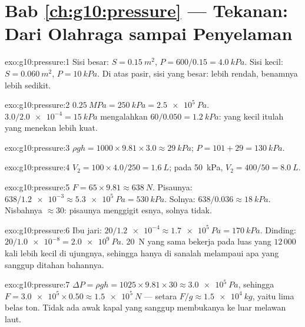 \section*{Bab \ref{ch:g10:pressure} --- Tekanan: Dari Olahraga sampai Penyelaman}

\begin{solution}{exo:g10:pressure:1}
Sisi besar: $S = \qty{0.15}{m^2}$, $P = 600/0.15 = \qty{4.0}{kPa}$.
Sisi kecil: $S = \qty{0.060}{m^2}$, $P = \qty{10}{kPa}$. Di atas pasir,
sisi yang besar:  lebih rendah, benamnya lebih sedikit.
\end{solution}

\begin{solution}{exo:g10:pressure:2}
$\qty{0.25}{MPa} = \qty{250}{kPa} = \qty{2.5e5}{Pa}$.
$3.0/\num{2.0e-4} = \qty{15}{kPa}$ mengalahkan
$60/0.050 = \qty{1.2}{kPa}$:  yang kecil itulah yang menekan lebih
kuat.
\end{solution}

\begin{solution}{exo:g10:pressure:3}
$\rho g h = 1000 \times 9.81 \times 3.0 \approx \qty{29}{kPa}$;
 $P = 101 + 29 = \qty{130}{kPa}$.
\end{solution}

\begin{solution}{exo:g10:pressure:4}
$V_2 = 100 \times 4.0 / 250 = \qty{1.6}{L}$;
pada \qty{50}{kPa}, $V_2 = 400/50 = \qty{8.0}{L}$.
\end{solution}

\begin{solution}{exo:g10:pressure:5}
$F = 65 \times 9.81 \approx \qty{638}{N}$. Pisaunya:
$638/\num{1.2e-3} \approx \qty{5.3e5}{Pa} = \qty{530}{kPa}$. Solnya:
$638/0.036 \approx \qty{18}{kPa}$. Nisbahnya $\approx 30$: pisaunya
menggigit esnya, solnya tidak.
\end{solution}

\begin{solution}{exo:g10:pressure:6}
Ibu jari: $20/\num{1.2e-4} \approx \qty{1.7e5}{Pa} = \qty{170}{kPa}$.
Dinding: $20/\num{1.0e-8} = \qty{2.0e9}{Pa}$.  \qty{20}{N} yang sama
bekerja pada luas yang $12\,000$ kali lebih kecil di ujungnya, sehingga
hanya di sanalah  melampaui apa yang sanggup ditahan bahannya.
\end{solution}

\begin{solution}{exo:g10:pressure:7}
$\Delta P = \rho g h = 1025 \times 9.81 \times 30 \approx
\qty{3.0e5}{Pa}$, sehingga
$F = \num{3.0e5} \times 0.50 \approx \qty{1.5e5}{N}$ --- setara 
$F/g \approx \qty{1.5e4}{kg}$, yaitu lima belas ton. Tidak ada awak
kapal yang sanggup membukanya ke luar melawan laut.
\end{solution}

